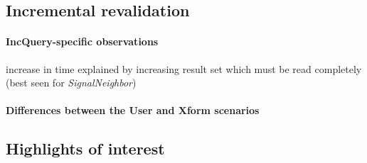 \subsection{Incremental revalidation}


% 

\paragraph{IncQuery-specific observations}

increase in time explained by increasing result set which must be read completely
(best seen for \emph{SignalNeighbor})

 
 

\paragraph{Differences between the User and Xform scenarios}

\subsection{Highlights of interest}

